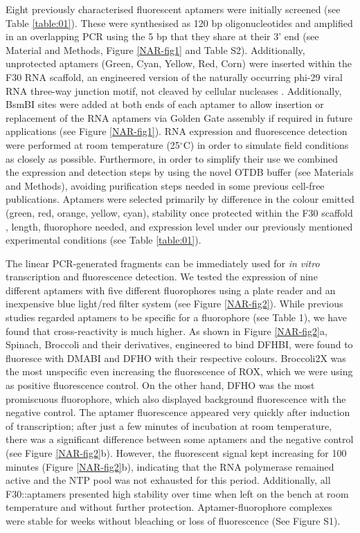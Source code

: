 Eight previously characterised fluorescent aptamers were initially screened (see Table \ref{table:01}). These were synthesised as 120 bp oligonucleotides and amplified in an overlapping PCR using the 5 bp that they share at their 3' end (see Material and Methods, Figure \ref{NAR-fig1} and Table S2). Additionally, unprotected aptamers (Green, Cyan, Yellow, Red, Corn) were inserted within the F30 RNA scaffold, an engineered version of the naturally occurring phi-29 viral RNA three-way junction motif, not cleaved by cellular nucleases \cite{21}. Additionally, BsmBI sites were added at both ends of each aptamer to allow insertion or replacement of the RNA aptamers via Golden Gate assembly if required in future applications (see Figure \ref{NAR-fig1}). RNA expression and fluorescence detection were performed at room temperature (25$^{\circ}$C) in order to simulate field conditions as closely as possible. Furthermore, in order to simplify their use we combined the expression and detection steps by using the novel OTDB buffer (see Materials and Methods), avoiding purification steps needed in some previous cell-free publications. Aptamers were selected primarily by difference in the colour emitted (green, red, orange, yellow, cyan), stability once protected within the F30 scaffold \cite{21}, length, fluorophore needed, and expression level under our previously mentioned experimental conditions (see Table \ref{table:01}). 

The linear PCR-generated fragments can be immediately used for \textit{in vitro} transcription and fluorescence detection. We tested the expression of nine different aptamers with five different fluorophores using a plate reader and an inexpensive blue light/red filter system (see Figure \ref{NAR-fig2}). While previous studies regarded aptamers to be specific for a fluorophore (see Table 1), we have found that cross-reactivity is much higher. As shown in Figure \ref{NAR-fig2}a, Spinach, Broccoli and their derivatives, engineered to bind DFHBI, were found to fluoresce with DMABI and DFHO with their respective colours. Broccoli2X was the most unspecific even increasing the fluorescence of ROX, which we were using as positive fluorescence control. On the other hand, DFHO was the most promiscuous fluorophore, which also displayed background fluorescence with the negative control. 
The aptamer fluorescence appeared very quickly after induction of transcription; after just a few minutes of incubation at room temperature, there was a significant difference between some aptamers and the negative control (see Figure \ref{NAR-fig2}b). However, the fluorescent signal kept increasing for 100 minutes (Figure \ref{NAR-fig2}b), indicating that the RNA polymerase remained active and the NTP pool was not exhausted for this period. Additionally, all F30::aptamers presented high stability over time when left on the bench at room temperature and without further protection. Aptamer-fluorophore complexes were stable for weeks without bleaching or loss of fluorescence (See Figure S1).

